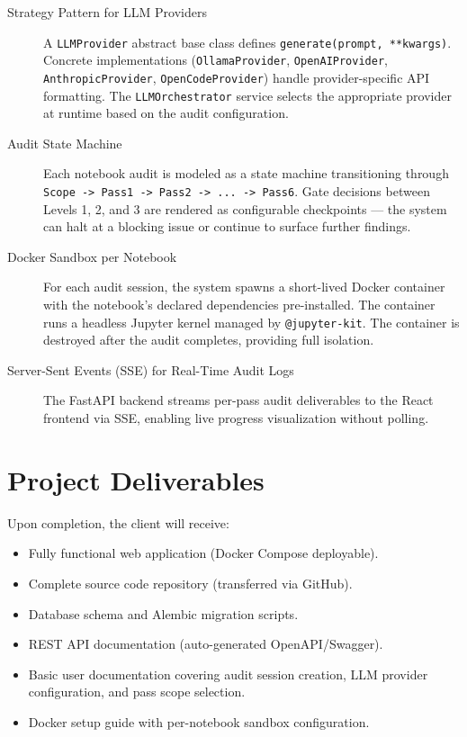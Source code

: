 \documentclass[11pt, a4paper]{article}
\begin{document}
\begin{description}
  \item[Strategy Pattern for LLM Providers] A \texttt{LLMProvider} abstract base
    class defines \texttt{generate(prompt, **kwargs)}. Concrete implementations
    (\texttt{OllamaProvider}, \texttt{OpenAIProvider}, \texttt{AnthropicProvider},
    \texttt{OpenCodeProvider}) handle provider-specific API formatting. The
    \texttt{LLMOrchestrator} service selects the appropriate provider at runtime
    based on the audit configuration.

  \item[Audit State Machine] Each notebook audit is modeled as a state machine
    transitioning through \texttt{Scope -> Pass1 -> Pass2 -> ... -> Pass6}. Gate
    decisions between Levels 1, 2, and 3 are rendered as configurable checkpoints
    --- the system can halt at a blocking issue or continue to surface further
    findings.

  \item[Docker Sandbox per Notebook] For each audit session, the system spawns a
    short-lived Docker container with the notebook's declared dependencies
    pre-installed. The container runs a headless Jupyter kernel managed by
    \texttt{@jupyter-kit}. The container is destroyed after the audit completes,
    providing full isolation.

  \item[Server-Sent Events (SSE) for Real-Time Audit Logs] The FastAPI backend
    streams per-pass audit deliverables to the React frontend via SSE, enabling
    live progress visualization without polling.
\end{description}

\section{Project Deliverables}

Upon completion, the client will receive:

\begin{itemize}
  \item Fully functional web application (Docker Compose deployable).
  \item Complete source code repository (transferred via GitHub).
  \item Database schema and Alembic migration scripts.
  \item REST API documentation (auto-generated OpenAPI/Swagger).
  \item Basic user documentation covering audit session creation, LLM provider
    configuration, and pass scope selection.
  \item Docker setup guide with per-notebook sandbox configuration.
\end{itemize}
\end{document}

